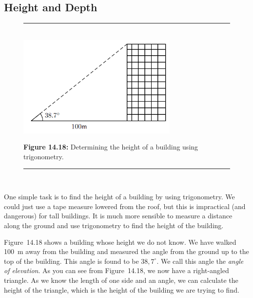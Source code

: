             \subsection{ Height and Depth}
            \nopagebreak
    \setcounter{subfigure}{0}
	\begin{figure}[H] %
    \begin{center}
    \rule[.1in]{\figurerulewidth}{.005in} \\
        \label{m39411*uid26!!!underscore!!!media}\label{m39411*uid26!!!underscore!!!printimage}\includegraphics[width=300px]{col11306.imgs/m39411_MG10C15_012.png} %
      \vspace{2pt}
    \vspace{\rubberspace}\par \begin{cnxcaption}
	  \small \textbf{Figure 14.18: }Determining the height of a building using trigonometry.
	\end{cnxcaption}
    \vspace{.1in}
    \rule[.1in]{\figurerulewidth}{.005in} \\
    \end{center}
 \end{figure}       
        \label{m39411*id81653}One simple task is to find the height of a building by using trigonometry. We could just use a tape measure lowered from the roof, but this is impractical (and dangerous) for tall buildings. It is much more sensible to measure a distance along the ground and use trigonometry to find the height of the building.\par 
        \label{m39411*id81658}Figure~14.18 shows a building whose height we do not know. We have walked 100~m away from the building and measured the angle from the ground up to the top of the building. This angle is found to be \begin{math}38,{7}^{\circ }\end{math}. We call this angle the \textsl{angle of elevation}. As you can see from Figure~14.18, we now have a right-angled triangle. As we know the length of one side and an angle, we can calculate the height of the triangle, which is the height of the building we are trying to find.\par 
